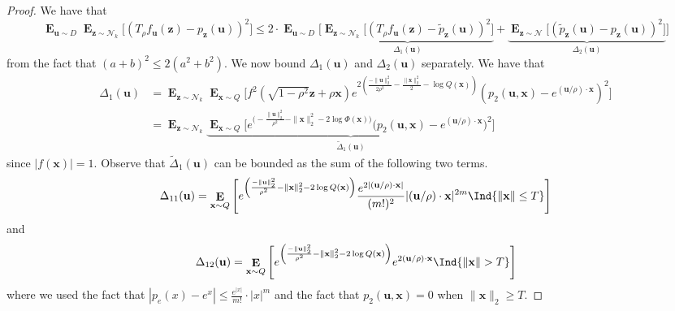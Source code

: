 \documentclass{theoretics}
\newcommand\twonorm[1]{\|#1\|_2}
\newcommand\norm[1]{\left\| #1 \right\|}
\renewcommand\vec[1]{\mathbf{#1}}
\DeclareMathOperator*{\E}{\mathbf{E}}
\newcommand{\1}{\Ind}
\newcommand{\x}{\vec x}
\newcommand{\vu}{\vec u}
\newcommand{\z}{\vec z}
\newcommand{\Gauss}{\mathcal{N}}
\begin{document}
\begin{proof}
    We have that 
    \[
    \E_{\vu\sim D}\E_{\z\sim \Gauss_k}\bigl[(T_{\rho}f_{\vu}(\z)-p_{\z}(\vu))^2\bigr]\leq 2\cdot \E_{\vu\sim D}\biggl[\underbrace{\E_{\z\sim \Gauss_k}\bigl[(T_{\rho}f_{\vu}(\z)-\tilde{p}_{\z}(\vu))^2\bigr]}_{\Delta_1(\vu)}+\underbrace{\E_{\z\sim \Gauss}\bigl[(\tilde{p}_{\z}(\vu)-{p}_{\z}(\vu))^2\bigr]}_{\Delta_2(\vu)}\biggr]
    \]
    from the fact that $(a+b)^2\leq 2(a^2+b^2)$. We now bound $\Delta_1(\vu)$ and $\Delta_2(\vu)$ separately. We have that 
    \begin{align*}
        \Delta_1(\vu)&=\E_{\z\sim \Gauss_k}\E_{\x\sim Q}\biggl[ f^2(\sqrt{1-\rho^2}\z+\rho\x)e^{2\left(\frac{-\twonorm{\vu}^2}{2\rho^2}-\frac{\twonorm{\x}^2}{2}-\log Q(\x)\right)}\left(p_2(\vu,\x)-e^{ (\vu/\rho)\cdot \x}\right)^2\biggr]\\
         &=\E_{\z\sim \Gauss_k}\underbrace{\E_{\x\sim Q}\biggl[e^{\bigl(-\frac{\twonorm{\vu}^2}{\rho^2}-\twonorm{\x}^2-2\log \Phi(\x)\bigr)}\bigl(p_2(\vu,\x)-e^{(\vu/\rho)\cdot \x}\bigr)^2\biggr]}_{\tilde{\Delta}_{1}(\vu)}
    \end{align*}
    since $|f(\x)|=1$. Observe that $\tilde{\Delta}_1(\vu)$ can be bounded as the sum of the following two terms.
    \[
        \Delta_{11}(\vu)=\E_{\x\sim Q}\left[e^{\left(\frac{-\twonorm{\vu}^2}{\rho^2}-{\twonorm{\x}^2}-2\log Q(\x)\right)}\frac{e^{2|(\vu/\rho)\cdot\x|}}{(m!)^2}|(\vu/\rho)\cdot \x|^{2m}
    \1\{\norm{\x}\leq T\}\right]\] and 
    \[
      \Delta_{12}(\vu)=  \E_{\x\sim Q}\left[e^{\left(\frac{-\twonorm{\vu}^2}{\rho^2}-\twonorm{\x}^2-2\log Q(\x)\right)}e^{2(\vu/\rho)\cdot \x}
      \1\{\norm{\x}> T\}\right]\] where we used the fact that $|p_e(x)-e^{x}|\leq \frac{e^{|x|}}{m!}\cdot |x|^{m}$ and the fact that $p_2(\vu,\x)=0$ when $\twonorm{\x}\geq T$.


\end{proof}
\end{document}
